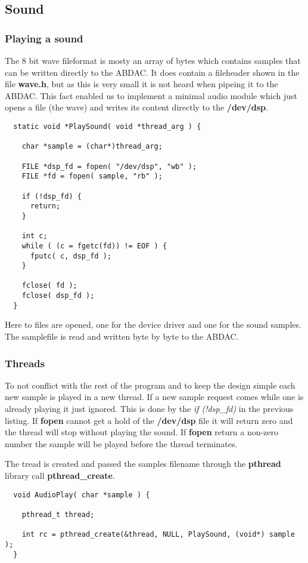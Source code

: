 \subsection{Sound}

\subsubsection{Playing a sound}
The 8 bit wave fileformat is mosty an array of bytes which contains samples that can be written
directly to the ABDAC. It does contain a fileheader shown in the file {\bf wave.h}, but as this is very
small it is not heard when pipeing it to the ABDAC. This fact enabled us to implement a minimal audio
module which just opens a file (the wave) and writes its content directly to the {\bf /dev/dsp}.

\begin{lstlisting}
  static void *PlaySound( void *thread_arg ) {

    char *sample = (char*)thread_arg;

    FILE *dsp_fd = fopen( "/dev/dsp", "wb" );
    FILE *fd = fopen( sample, "rb" );

    if (!dsp_fd) {
      return;
    }

    int c;
    while ( (c = fgetc(fd)) != EOF ) {
      fputc( c, dsp_fd );
    }

    fclose( fd );
    fclose( dsp_fd );
  }

\end{lstlisting}

Here to files are opened, one for the device driver and one for the sound samples. The samplefile
is read and written byte by byte to the ABDAC.

\subsubsection{Threads}
To not conflict with the rest of the program and to keep the design simple each new sample is
played in a new thread. If a new sample request comes while one is already playing it just ignored.
This is done by the {\it if (!dsp\_fd)} in the previous listing. If {\bf fopen} cannot get a hold
of the {\bf /dev/dsp} file it will return zero and the thread will stop without playing the sound.
If {\bf fopen} return a non-zero number the sample will be played before the thread terminates.

The tread is created and passed the samples filename through the {\bf pthread} library call
{\bf pthread\_create}.
\begin{lstlisting}
  void AudioPlay( char *sample ) {

    pthread_t thread;

    int rc = pthread_create(&thread, NULL, PlaySound, (void*) sample );
  }
\end{lstlisting}
